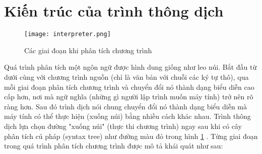 \section{Kiến trúc của trình thông dịch}
\begin{figure}[H]
    \texttt{[image: interpreter.png]}   
    \centering
    \caption{Các giai đoạn khi phân tích chương trình} 
    \label{fig:stages}
\end{figure}

Quá trình phân tích một ngôn ngữ được hình dung giống như leo núi. Bắt đầu từ dưới cùng với chương trình nguồn (chỉ là văn bản với chuỗi các ký tự thô), qua mỗi giai đoạn phân tích chương trình và chuyển đổi nó thành dạng biểu diễn cao cấp hơn, nơi mà ngữ nghĩa (những gì người lập trình muốn máy tính) trở nên rõ ràng hơn. Sau đó trình dịch nói chung chuyển đổi nó thành dạng biểu diễn mà máy tính có thể thực hiện (xuống núi) bằng nhiều cách khác nhau. Trình thông dịch lựa chọn đường "xuống núi" (thực thi chương trình) ngay sau khi có cây phân tích cú pháp (syntax tree) như đường màu đỏ trong hình \ref{fig:stages} \cite{craftinginterpreters}. Từng giai đoạn trong quá trình phân tích chương trình được mô tả khái quát như sau:            





